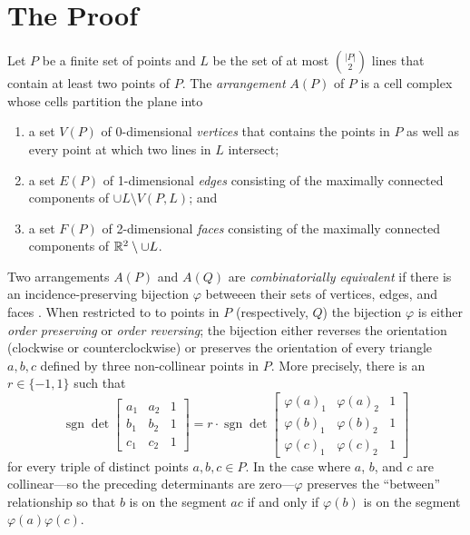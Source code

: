 \documentclass{patmorin}
\DeclareMathOperator{\sgn}{sgn}
\begin{document}
\section{The Proof}

Let $P$ be a finite set of points and $L$ be the set of at most
$\binom{|P|}{2}$ lines that contain at least two points of $P$.
The \emph{arrangement} $A(P)$ of $P$ is a cell complex whose cells
partition the plane into
\begin{enumerate}
  \item a set $V(P)$ of 0-dimensional \emph{vertices} that contains
  the points in $P$ as well as every point at which two lines in $L$
  intersect;

  \item a set $E(P)$ of 1-dimensional \emph{edges} consisting of the
  maximally connected components of $\cup L\setminus V(P,L)$; and

  \item a set $F(P)$ of 2-dimensional \emph{faces} consisting of the
   maximally connected components of $\mathbb{R}^2\setminus \cup L$.
\end{enumerate}

Two arrangements $A(P)$ and $A(Q)$ are \emph{combinatorially equivalent}
if there is an incidence-preserving bijection $\varphi$ betweeen their
sets of vertices, edges, and faces \cite[Page~4]{grunbaum:arrangements}.
When restricted to to points in $P$ (respectively, $Q$) the
bijection $\varphi$ is either \emph{order preserving} or \emph{order
reversing};  the bijection either reverses the orientation (clockwise or
counterclockwise) or preserves the orientation of every triangle $a,b,c$
defined by three non-collinear points in $P$.  More precisely, there is
an $r\in\{-1,1\}$ such that
\[
    \sgn\det \left[\begin{array}{ccc}
       a_1 & a_2 & 1 \\
       b_1 & b_2 & 1 \\
       c_1 & c_2 & 1 
    \end{array}\right]
      =
    r\cdot \sgn\det \left[\begin{array}{ccc}
       \varphi(a)_1 & \varphi(a)_2 & 1 \\
       \varphi(b)_1 & \varphi(b)_2 & 1 \\
       \varphi(c)_1 & \varphi(c)_2 & 1 
    \end{array}\right]
\]
for every triple of distinct points $a,b,c\in P$.  In the case where
$a$, $b$, and $c$ are collinear---so the preceding determinants are
zero---$\varphi$ preserves the ``between'' relationship so that $b$ is
on the segment $ac$ if and only if $\varphi(b)$ is on the segment
$\varphi(a)\varphi(c)$.
\end{document}

